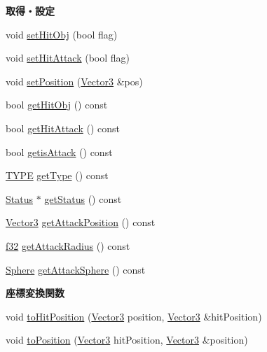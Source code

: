 \begin{Indent}{\bf 取得・設定}\par
\begin{DoxyCompactItemize}
\item 
void \hyperlink{class_man_afda6e5985073544617c174cc77c0877b}{set\-Hit\-Obj} (bool flag)
\item 
void \hyperlink{class_man_a7dc9b3601c7808edcbdcd42973185797}{set\-Hit\-Attack} (bool flag)
\item 
void \hyperlink{class_man_a8815ca1006f5aaa8d2273f3e4dde6739}{set\-Position} (\hyperlink{struct_vector3}{Vector3} \&pos)
\item 
bool \hyperlink{class_man_ac68419faa2b82119da5d2c8fdd9e5699}{get\-Hit\-Obj} () const 
\item 
bool \hyperlink{class_man_aa48106fafd47b8b1099be41963c9dc5b}{get\-Hit\-Attack} () const 
\item 
bool \hyperlink{class_man_ac57d74d748cbc039e970c1f5fb98140a}{getis\-Attack} () const 
\item 
\hyperlink{class_man_af2f4c50db54b697f45e30dd4161d0d7c}{T\-Y\-P\-E} \hyperlink{class_man_a2ce2bab28ed38e2f816be1c560b18462}{get\-Type} () const 
\item 
\hyperlink{struct_status}{Status} $\ast$ \hyperlink{class_man_a60341fe647e8671b969c61f6d702a26e}{get\-Status} () const 
\item 
\hyperlink{struct_vector3}{Vector3} \hyperlink{class_man_ad547da782e80d85e048da7dc43722c5b}{get\-Attack\-Position} () const 
\item 
\hyperlink{_main_8h_a5f6906312a689f27d70e9d086649d3fd}{f32} \hyperlink{class_man_ad70958fa74261ddfab75826a7c5df47b}{get\-Attack\-Radius} () const 
\item 
\hyperlink{struct_sphere}{Sphere} \hyperlink{class_man_ad15b88273b6cb08c5d24391ccb7b27f9}{get\-Attack\-Sphere} () const 
\end{DoxyCompactItemize}
\end{Indent}
\begin{Indent}{\bf 座標変換関数}\par
\begin{DoxyCompactItemize}
\item 
void \hyperlink{class_man_ac1011efd52b90022fb3f7d1b9a3710f9}{to\-Hit\-Position} (\hyperlink{struct_vector3}{Vector3} position, \hyperlink{struct_vector3}{Vector3} \&hit\-Position)
\item 
void \hyperlink{class_man_a9087121fafce35e0c26656113d22b66c}{to\-Position} (\hyperlink{struct_vector3}{Vector3} hit\-Position, \hyperlink{struct_vector3}{Vector3} \&position)
\end{DoxyCompactItemize}
\end{Indent}
